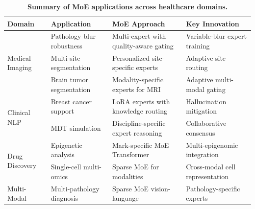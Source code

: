 
\begin{table}[htbp]
\centering
\caption{\textbf{Summary of MoE applications across healthcare domains.}}
\label{tab:moe_summary}
\small
\begin{tabular}{@{}p{2cm}p{3.5cm}p{4cm}p{3.5cm}@{}}
\toprule
\textbf{Domain} & \textbf{Application} & \textbf{MoE Approach} & \textbf{Key Innovation} \\
\midrule
\multirow{3}{2cm}{Medical Imaging} & Pathology blur robustness & Multi-expert with quality-aware gating & Variable-blur expert training \citep{xie2024moe_pathology} \\
\cmidrule(lr){2-4}
& Multi-site segmentation & Personalized site-specific experts & Adaptive site routing \citep{rahman2025personalized_moe} \\
\cmidrule(lr){2-4}
& Brain tumor segmentation & Modality-specific experts for MRI & Adaptive multi-modal gating \citep{kim2026amoe_bts} \\
\midrule
\multirow{2}{2cm}{Clinical NLP} & Breast cancer support & LoRA experts with knowledge routing & Hallucination mitigation \citep{bechar2025biocancer_moe} \\
\cmidrule(lr){2-4}
& MDT simulation & Discipline-specific expert reasoning & Collaborative consensus \citep{chen2026cor_mole} \\
\midrule
\multirow{2}{2cm}{Drug Discovery} & Epigenetic analysis & Mark-specific MoE Transformer & Multi-epigenomic integration \citep{acharya2025mobius} \\
\cmidrule(lr){2-4}
& Single-cell multi-omics & Sparse MoE for modalities & Cross-modal cell representation \citep{yun2024scmoe} \\
\midrule
\multirow{1}{2cm}{Multi-Modal} & Multi-pathology diagnosis & Sparse MoE vision-language & Pathology-specific experts \citep{khan2025medvlmoe} \\
\bottomrule
\end{tabular}
\end{table}

